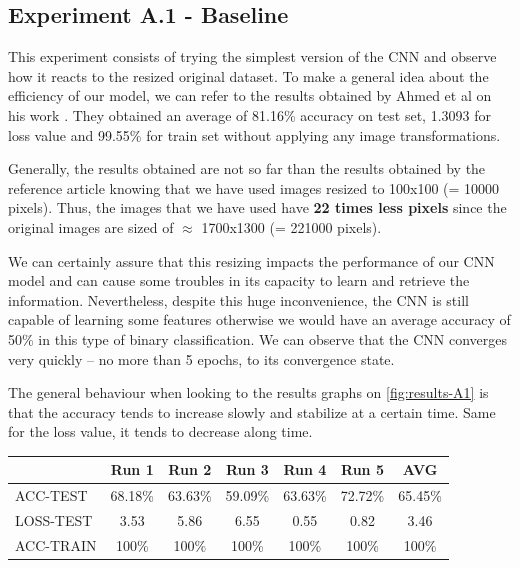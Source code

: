 \documentclass[11pt, openany]{report}
\theoremstyle{plain}
\theoremstyle{definition}
\theoremstyle{remark}
\begin{document}
\subsection{Experiment A.1 - Baseline}

This experiment consists of trying the simplest version of the CNN and observe how it reacts to the resized original dataset. To make a general idea about the efficiency of our model, we can refer to the results obtained by Ahmed et al on his work \cite{leukemia}. They obtained an average of 81.16\% accuracy on test set, 1.3093 for loss value and 99.55\% for train set without applying any image transformations. 

Generally, the results obtained are not so far than the results obtained by the reference article \cite{leukemia} knowing that we have used images resized to 100x100 (= 10000 pixels). Thus, the images that we have used have \textbf{22 times less pixels} since the original images are sized of $\approx$ 1700x1300 (= 221000 pixels). 

We can certainly assure that this resizing impacts the performance of our CNN model and can cause some troubles in its capacity to learn and retrieve the information. Nevertheless, despite this huge inconvenience, the CNN is still capable of learning some features otherwise we would have an average accuracy of 50\% in this type of binary classification.   
We can observe that the CNN converges very quickly -- no more than 5 epochs, to its convergence state.  

The general behaviour when looking to the results graphs on \autoref{fig:results-A1} is that the accuracy tends to increase slowly and stabilize at a certain time. Same for the loss value, it tends to decrease along time.  

\vspace{1cm}


\begin{center}
\begin{tabular}{|l|c|c|c|c|c|c|}
  \hline
   & \textbf{Run 1} & \textbf{Run 2} & \textbf{Run 3} & \textbf{Run 4} & \textbf{Run 5} & \textbf{AVG}\\
  \hline
  ACC-TEST & 68.18\% & 63.63\% & 59.09\% & 63.63\% & 72.72\% & 65.45\% \\
  LOSS-TEST & 3.53 & 5.86 & 6.55 & 0.55  & 0.82 & 3.46 \\ 
  ACC-TRAIN & 100\% & 100\% & 100\% & 100\% & 100\% & 100\% \\ 
  \hline
\end{tabular}
\label{table:results-A1}
\end{center}
\end{document}
